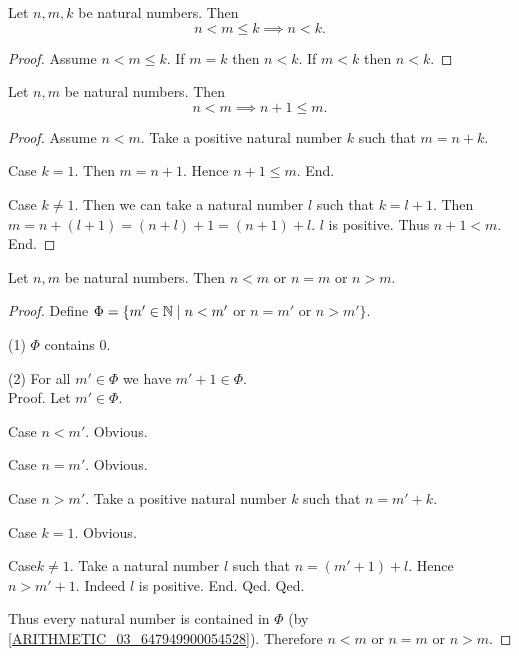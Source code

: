\documentclass[10pt]{article}
\begin{document}
  \begin{forthel}
    \begin{proposition}
      Let $n, m, k$ be natural numbers.
      Then \[ n < m \leq k \implies n < k. \]
    \end{proposition}
    \begin{proof}
      Assume $n < m \leq k$.
      If $m = k$ then $n < k$.
      If $m < k$ then $n < k$.
    \end{proof}
  \end{forthel}

  \begin{forthel}
    \begin{proposition}
      Let $n, m$ be natural numbers.
      Then \[ n < m \implies n + 1 \leq m. \]
    \end{proposition}
    \begin{proof}
      Assume $n < m$.
      Take a positive natural number $k$ such that $m = n + k$.

      Case $k = 1$.
        Then $m = n + 1$.
        Hence $n + 1 \leq m$.
      End.

      Case $k \neq 1$.
        Then we can take a natural number $l$ such that $k = l + 1$.
        Then $m
          = n + (l + 1)
          = (n + l) + 1
          = (n + 1) + l$.
        $l$ is positive.
        Thus $n + 1 < m$.
      End.
    \end{proof}
  \end{forthel}

  \begin{forthel}
    \begin{proposition}
      Let $n, m$ be natural numbers.
      Then $n < m$ or $n = m$ or $n > m$.
    \end{proposition}
    \begin{proof}
      Define $\Phi = \{ m' \in \mathbb{N} \mid n < m'$ or $n = m'$ or $n > m' \}$.

      (1) $\Phi$ contains $0$.

      (2) For all $m' \in \Phi$ we have $m' + 1 \in \Phi$. \\
      Proof.
        Let $m' \in \Phi$.

        Case $n < m'$. Obvious.

        Case $n = m'$. Obvious.

        Case $n > m'$.
          Take a positive natural number $k$ such that $n = m' + k$.

          Case $k = 1$. Obvious.

          Case$k \neq 1$.
            Take a natural number $l$ such that $n = (m' + 1) + l$.
            Hence $n > m' + 1$.
            Indeed $l$ is positive.
          End.
        Qed.
      Qed.

      Thus every natural number is contained in $\Phi$ (by \cref{ARITHMETIC_03_647949900054528}).
      Therefore $n < m$ or $n = m$ or $n > m$.
    \end{proof}
  \end{forthel}
\end{document}
